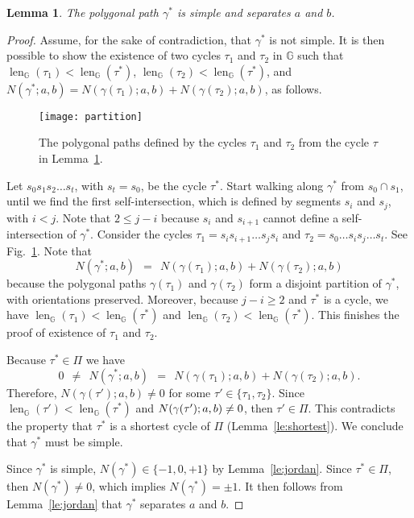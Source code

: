 \documentclass[11pt,a4paper]{article}
\newtheorem{lemma}[definition]{Lemma}
\def\I{\ensuremath{\mathbb{G}}}
\DeclareMathOperator{\lengthBIS}{len}
\newcommand\length{\lengthBIS_{\I}}
\begin{document}
\begin{lemma}\label{le:feasible}
	The polygonal path $\gamma^*$ is simple and separates $a$ and $b$.
\end{lemma}
\begin{proof}
Assume, for the sake of contradiction, that $\gamma^*$ is not simple.
	It is then possible to show the existence of two cycles $\tau_1$ and $\tau_2$ in $\I$ such that
	$\length(\tau_1)<\length(\tau^*)$,
	$\length(\tau_2)<\length(\tau^*)$,
	and $N(\gamma^*;a,b)= N(\gamma(\tau_1);a,b)+ N(\gamma(\tau_2);a,b)$,
	as follows.
	
	\begin{figure}
		\centering
			\texttt{[image: partition]}
			\caption{The polygonal paths defined by the cycles $\tau_1$ and $\tau_2$ from the cycle $\tau$ in Lemma~\ref{le:feasible}.}
			\label{fig:partition}
	\end{figure}	

	Let $s_0 s_1s_2\dots s_t$, with $s_t=s_0$, be the cycle $\tau^*$.
	Start walking along $\gamma^*$ from $s_0\cap s_1$, until we find the first self-intersection,
	which is defined by segments $s_i$ and $s_j$, with $i< j$.
	Note that $2\le j-i$ because $s_i$ and $s_{i+1}$ cannot define a self-intersection of $\gamma^*$.
	Consider the cycles $\tau_1 = s_i s_{i+1}\dots s_j s_i$
	and $\tau_2=s_0\dots s_i s_j \dots s_t$. See Fig.~\ref{fig:partition}.
	Note that
	\[
		N(\gamma^*;a,b) ~~=~~ N(\gamma(\tau_1);a,b) + N(\gamma(\tau_2);a,b) 
	\]
	because the polygonal paths $\gamma(\tau_1)$ and $\gamma(\tau_2)$ form a disjoint partition
	of $\gamma^*$, with orientations preserved.
	Moreover, because $j-i\ge 2$ and $\tau^*$ is a cycle,
	we have $\length(\tau_1)< \length (\tau^*)$ and $\length(\tau_2)< \length (\tau^*)$.
	This finishes the proof of existence of $\tau_1$ and $\tau_2$.

	Because $\tau^*\in \Pi$ we have 
	\[
		0~~ \not= ~~ N(\gamma^*;a,b)~~ =~~ N(\gamma(\tau_1);a,b) + N(\gamma(\tau_2);a,b) .
	\]
	Therefore, $N(\gamma(\tau');a,b)\not = 0$ for some $\tau'\in\{ \tau_1,\tau_2\}$. 
	Since $\length(\tau')<\length (\tau^*)$ and $N(\gamma(\tau');a,b)\\ \not = 0$,
	then $\tau'\in \Pi$. This contradicts the property that $\tau^*$ is a shortest
	cycle of $\Pi$ (Lemma~\ref{le:shortest}).
	We conclude that $\gamma^*$ must be simple.
		
	Since $\gamma^*$ is simple, $N(\gamma^*)\in \{ -1,0,+1\}$ by Lemma~\ref{le:jordan}.
	Since $\tau^*\in \Pi$, then $N(\gamma^*)\not = 0$, which implies $N(\gamma^*)= \pm 1$.
	It then follows from Lemma~\ref{le:jordan} that $\gamma^*$ separates $a$ and $b$.\qedhere	
\end{proof}
\end{document}
